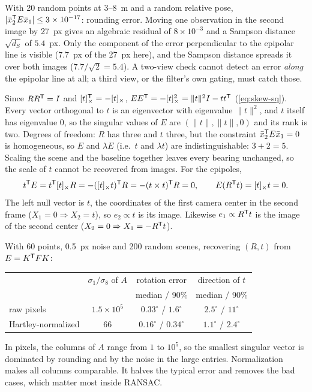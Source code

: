 \begin{solutions}
  \item With 20 random points at 3--8~m and a random relative pose, $|\bar x_2^{\mathsf{T}} E\bar x_1| \le 3\times10^{-17}$: rounding error. Moving one observation in the second image
        by 27~px gives an algebraic residual of $8\times10^{-3}$ and a Sampson distance $\sqrt{d_S}$ of $5.4$~px. Only the component of the error perpendicular to the
        epipolar line is visible (7.7~px of the 27~px here), and the Sampson distance spreads it over both images ($7.7/\sqrt2 = 5.4$). A two-view check cannot
        detect an error \emph{along} the epipolar line at all; a third view, or the filter's own gating, must catch those.

  \item Since $RR^{\mathsf{T}} = I$ and $[t]_{\times}^{\mathsf{T}} = -[t]_{\times}$, $EE^{\mathsf{T}} = -[t]_{\times}^2 = \|t\|^2I - tt^{\mathsf{T}}$ (\eqref{eq:skew-sq}). Every vector orthogonal to $t$ is an eigenvector with eigenvalue
        $\|t\|^2$, and $t$ itself has eigenvalue 0, so the singular values of $E$ are $(\|t\|, \|t\|, 0)$ and its rank is two. Degrees of freedom: $R$ has three and $t$ three,
        but the constraint $\bar x_2^{\mathsf{T}} E\bar x_1 = 0$ is homogeneous, so $E$ and $\lambda E$ (i.e.\ $t$ and $\lambda t$) are indistinguishable: $3 + 2 = 5$. Scaling the scene and
        the baseline together leaves every bearing unchanged, so the scale of $t$ cannot be recovered from images. For the epipoles,
        \[
          t^{\mathsf{T}} E = t^{\mathsf{T}}[t]_{\times}R = -([t]_{\times}t)^{\mathsf{T}} R = -(t\times t)^{\mathsf{T}} R = 0, \qquad E(R^{\mathsf{T}} t) = [t]_{\times}t = 0 .
        \]
        The left null vector is $t$, the coordinates of the first camera center in the second frame ($X_1 = 0 \Rightarrow X_2 = t$), so $e_2 \propto t$ is its image. Likewise
        $e_1 \propto R^{\mathsf{T}} t$ is the image of the second center ($X_2 = 0 \Rightarrow X_1 = -R^{\mathsf{T}} t$).

  \item With 60 points, 0.5~px noise and 200 random scenes, recovering $(R, t)$ from $E = K^{\mathsf{T}} FK$:
        \begin{center}\small
        \begin{tabular}{@{}l c c c@{}}
        \toprule
        & $\sigma_1/\sigma_8$ of $A$ & rotation error & direction of $t$ \\
        & & median / 90\% & median / 90\% \\
        \midrule
        raw pixels & $1.5\times10^5$ & $0.33^\circ$ / $1.6^\circ$ & $2.5^\circ$ / $11^\circ$ \\
        Hartley-normalized & 66 & $0.16^\circ$ / $0.34^\circ$ & $1.1^\circ$ / $2.4^\circ$ \\
        \bottomrule
        \end{tabular}
        \end{center}
        In pixels, the columns of $A$ range from $1$ to $10^5$, so the smallest singular vector is dominated by rounding and by the noise in the large entries.
        Normalization makes all columns comparable. It halves the typical error and removes the bad cases, which matter most inside RANSAC.


\end{solutions}
